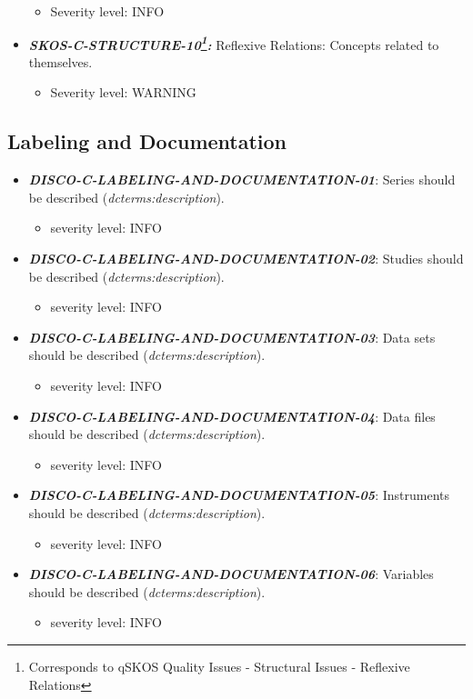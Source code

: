 \documentclass{llncs}
\begin{document}
\begin{itemize}
	\begin{itemize}
		\item Severity level: INFO
	\end{itemize}
	\item \textbf{{\em SKOS-C-STRUCTURE-10\footnote{Corresponds to qSKOS Quality Issues - Structural Issues - Reflexive Relations}:}}
	Reflexive Relations:
	Concepts related to themselves. 
	\begin{itemize}
		\item Severity level: WARNING
	\end{itemize}
\end{itemize}

\subsection{Labeling and Documentation}

\begin{itemize}
	\item \textbf{{\em DISCO-C-LABELING-AND-DOCUMENTATION-01}}: 
	Series should be described (\emph{dcterms:description}).
	\begin{itemize}
		\item severity level: INFO
	\end{itemize}
	\item \textbf{{\em DISCO-C-LABELING-AND-DOCUMENTATION-02}}: 
	Studies should be described (\emph{dcterms:description}).
	\begin{itemize}
		\item severity level: INFO
	\end{itemize}
	\item \textbf{{\em DISCO-C-LABELING-AND-DOCUMENTATION-03}}: 
	Data sets should be described (\emph{dcterms:description}).
	\begin{itemize}
		\item severity level: INFO
	\end{itemize}
	\item \textbf{{\em DISCO-C-LABELING-AND-DOCUMENTATION-04}}: 
	Data files should be described (\emph{dcterms:description}).
	\begin{itemize}
		\item severity level: INFO
	\end{itemize}
	\item \textbf{{\em DISCO-C-LABELING-AND-DOCUMENTATION-05}}: 
	Instruments should be described (\emph{dcterms:description}).
	\begin{itemize}
		\item severity level: INFO
	\end{itemize}
	\item \textbf{{\em DISCO-C-LABELING-AND-DOCUMENTATION-06}}: 
	Variables should be described (\emph{dcterms:description}).
	\begin{itemize}
		\item severity level: INFO
	\end{itemize}
\end{itemize}
\end{document}
